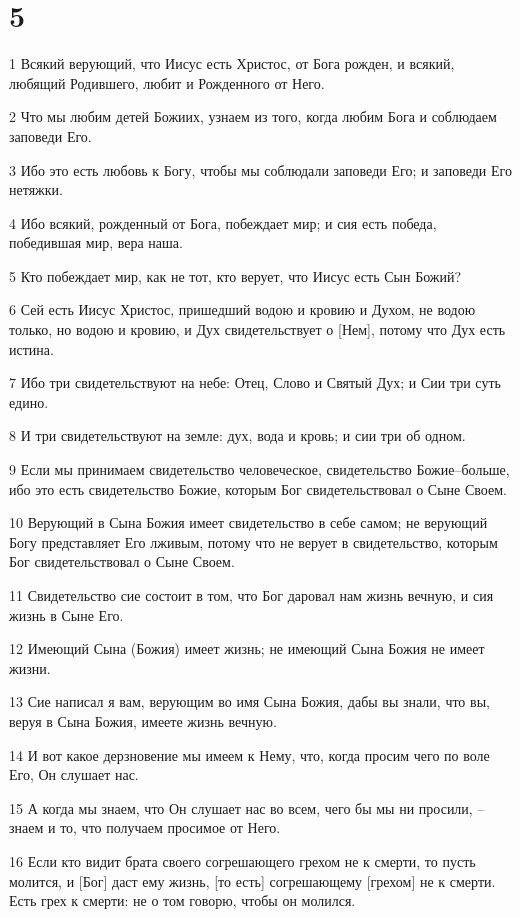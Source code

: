 \chapter{5}

\par 1 Всякий верующий, что Иисус есть Христос, от Бога рожден, и всякий, любящий Родившего, любит и Рожденного от Него.
\par 2 Что мы любим детей Божиих, узнаем из того, когда любим Бога и соблюдаем заповеди Его.
\par 3 Ибо это есть любовь к Богу, чтобы мы соблюдали заповеди Его; и заповеди Его нетяжки.
\par 4 Ибо всякий, рожденный от Бога, побеждает мир; и сия есть победа, победившая мир, вера наша.
\par 5 Кто побеждает мир, как не тот, кто верует, что Иисус есть Сын Божий?
\par 6 Сей есть Иисус Христос, пришедший водою и кровию и Духом, не водою только, но водою и кровию, и Дух свидетельствует о [Нем], потому что Дух есть истина.
\par 7 Ибо три свидетельствуют на небе: Отец, Слово и Святый Дух; и Сии три суть едино.
\par 8 И три свидетельствуют на земле: дух, вода и кровь; и сии три об одном.
\par 9 Если мы принимаем свидетельство человеческое, свидетельство Божие--больше, ибо это есть свидетельство Божие, которым Бог свидетельствовал о Сыне Своем.
\par 10 Верующий в Сына Божия имеет свидетельство в себе самом; не верующий Богу представляет Его лживым, потому что не верует в свидетельство, которым Бог свидетельствовал о Сыне Своем.
\par 11 Свидетельство сие состоит в том, что Бог даровал нам жизнь вечную, и сия жизнь в Сыне Его.
\par 12 Имеющий Сына (Божия) имеет жизнь; не имеющий Сына Божия не имеет жизни.
\par 13 Сие написал я вам, верующим во имя Сына Божия, дабы вы знали, что вы, веруя в Сына Божия, имеете жизнь вечную.
\par 14 И вот какое дерзновение мы имеем к Нему, что, когда просим чего по воле Его, Он слушает нас.
\par 15 А когда мы знаем, что Он слушает нас во всем, чего бы мы ни просили, --знаем и то, что получаем просимое от Него.
\par 16 Если кто видит брата своего согрешающего грехом не к смерти, то пусть молится, и [Бог] даст ему жизнь, [то есть] согрешающему [грехом] не к смерти. Есть грех к смерти: не о том говорю, чтобы он молился.
